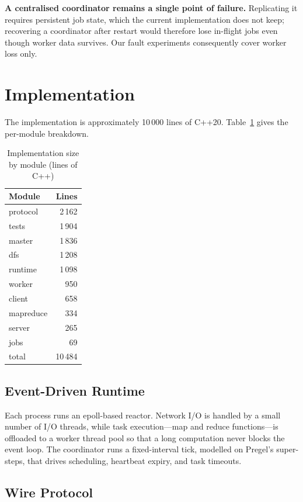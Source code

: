 \documentclass[conference]{IEEEtran}
\begin{document}
\textbf{A centralised coordinator remains a single point of failure.}
Replicating it requires persistent job state, which the current
implementation does not keep; recovering a coordinator after restart would
therefore lose in-flight jobs even though worker data survives. Our fault
experiments consequently cover worker loss only.

\section{Implementation}
\label{sec:impl}

The implementation is approximately 10\,000 lines of C++20. Table~\ref{tab:loc}
gives the per-module breakdown.

\begin{table}[t]
\caption{Implementation size by module (lines of C++)}
\label{tab:loc}
\centering
\begin{tabular}{@{}lr@{}}
\toprule
Module & Lines \\
\midrule
protocol & 2\,162 \\
tests & 1\,904 \\
master & 1\,836 \\
dfs & 1\,208 \\
runtime & 1\,098 \\
worker & 950 \\
client & 658 \\
mapreduce & 334 \\
server & 265 \\
jobs & 69 \\
\midrule
total & 10\,484 \\
\bottomrule
\end{tabular}
\end{table}

\subsection{Event-Driven Runtime}

Each process runs an epoll-based reactor. Network I/O is handled by a small
number of I/O threads, while task execution---map and reduce functions---is
offloaded to a worker thread pool so that a long computation never blocks the
event loop. The coordinator runs a fixed-interval tick, modelled on Pregel's
super-steps, that drives scheduling, heartbeat expiry, and task timeouts.

\subsection{Wire Protocol}
\end{document}
